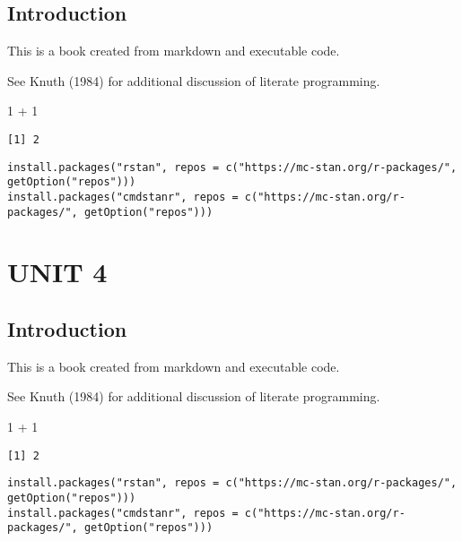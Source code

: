 \documentclass[
  letterpaper,
  DIV=11,
  numbers=noendperiod]{scrreprt}
\newenvironment{Shaded}{\begin{snugshade}}{\end{snugshade}}
\newcommand{\DecValTok}[1]{\textcolor[rgb]{0.68,0.00,0.00}{#1}}
\newcommand{\SpecialCharTok}[1]{\textcolor[rgb]{0.37,0.37,0.37}{#1}}
\begin{document}
\hypertarget{introduction-1}{%
\chapter{Introduction}\label{introduction-1}}

This is a book created from markdown and executable code.

See Knuth (1984) for additional discussion of literate programming.

\begin{Shaded}
\begin{Highlighting}[]
\DecValTok{1} \SpecialCharTok{+} \DecValTok{1}
\end{Highlighting}
\end{Shaded}

\begin{verbatim}
[1] 2
\end{verbatim}

\begin{verbatim}
install.packages("rstan", repos = c("https://mc-stan.org/r-packages/", getOption("repos")))
install.packages("cmdstanr", repos = c("https://mc-stan.org/r-packages/", getOption("repos")))
\end{verbatim}

\part{UNIT 4}

\hypertarget{introduction-2}{%
\chapter{Introduction}\label{introduction-2}}

This is a book created from markdown and executable code.

See Knuth (1984) for additional discussion of literate programming.

\begin{Shaded}
\begin{Highlighting}[]
\DecValTok{1} \SpecialCharTok{+} \DecValTok{1}
\end{Highlighting}
\end{Shaded}

\begin{verbatim}
[1] 2
\end{verbatim}

\begin{verbatim}
install.packages("rstan", repos = c("https://mc-stan.org/r-packages/", getOption("repos")))
install.packages("cmdstanr", repos = c("https://mc-stan.org/r-packages/", getOption("repos")))
\end{verbatim}
\end{document}
